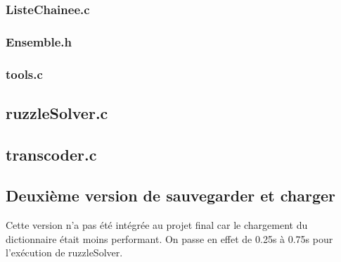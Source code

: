    \subsubsection{ListeChainee.c}
    \subsubsection{Ensemble.h}
    \subsubsection{tools.c}

  \subsection{ruzzleSolver.c}
  \subsection{transcoder.c}

\subsection{Deuxième version de sauvegarder et charger}
  Cette version n'a pas été intégrée au projet final car
  le chargement du dictionnaire était moins performant.
  On passe en effet de 0.25s à 0.75s pour l'exécution de
  ruzzleSolver.
